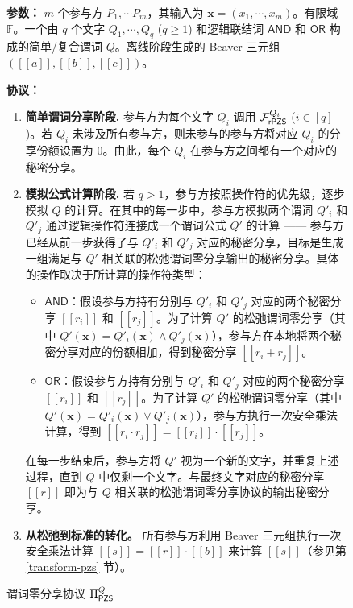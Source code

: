 \begin{figure}[!htb]
\begin{framed}
\begin{minipage}[c]{\textwidth}
\begin{trivlist}
\item \textbf{参数：} $m$ 个参与方 $P_1, \cdots P_m$，其输入为 $\textbf{x} = (x_1, \cdots, x_m)$。有限域 $\mathbb{F}$。一个由 $q$ 个文字 $Q_1,\cdots,Q_q$ ($q \ge 1$) 和逻辑联结词 $\mathsf{AND}$ 和 $\mathsf{OR}$ 构成的简单/复合谓词 $Q$。离线阶段生成的 Beaver 三元组 $([\! [ a ] \!], [\! [ b ] \!], [\! [ c ] \!])$。
\item \textbf{协议：}
\begin{enumerate}[itemsep=2pt,topsep=0pt,parsep=0pt,leftmargin=10pt]
\item \textbf{简单谓词分享阶段.} 参与方为每个文字 $Q_i$ 调用 $\mathcal{F}_\mathsf{rPZS}^{Q_i}$ ($i \in [q]$)。若 $Q_i$ 未涉及所有参与方，则未参与的参与方将对应 $Q_i$ 的分享份额设置为 $0$。由此，每个 $Q_i$ 在参与方之间都有一个对应的秘密分享。
\item \textbf{模拟公式计算阶段.} 若 $q>1$，参与方按照操作符的优先级，逐步模拟 $Q$ 的计算。在其中的每一步中，参与方模拟两个谓词 $Q'_i$ 和 $Q'_j$ 通过逻辑操作符连接成一个谓词公式 $Q'$ 的计算 —— 参与方已经从前一步获得了与 $Q'_i$ 和 $Q'_j$ 对应的秘密分享，目标是生成一组满足与 $Q'$ 相关联的松弛谓词零分享输出的秘密分享。具体的操作取决于所计算的操作符类型：
\begin{itemize}
\item $\mathsf{AND}$：假设参与方持有分别与 $Q'_i$ 和 $Q'_j$ 对应的两个秘密分享 $[\! [ r_i ] \!]$ 和 $[\! [ r_j ] \!]$。为了计算 $Q'$ 的松弛谓词零分享（其中 $Q'(\textbf{x}) = Q'_i(\textbf{x}) \land Q'_j(\textbf{x})$），参与方在本地将两个秘密分享对应的份额相加，得到秘密分享 $[\! [ r_i + r_j ] \!]$。
\item $\mathsf{OR}$：假设参与方持有分别与 $Q'_i$ 和 $Q'_j$ 对应的两个秘密分享 $[\! [ r_i ] \!]$ 和 $[\! [ r_j ] \!]$。为了计算 $Q'$ 的松弛谓词零分享（其中 $Q'(\textbf{x}) = Q'_i(\textbf{x}) \lor Q'_j(\textbf{x})$），参与方执行一次安全乘法计算，得到 $[\! [ r_i \cdot r_j ] \!] = [\! [ r_i ] \!] \cdot [\! [ r_j ] \!]$。
\end{itemize}
在每一步结束后，参与方将 $Q'$ 视为一个新的文字，并重复上述过程，直到 $Q$ 中仅剩一个文字。与最终文字对应的秘密分享 $[\! [ r ] \!]$ 即为与 $Q$ 相关联的松弛谓词零分享协议的输出秘密分享。
\item \textbf{从松弛到标准的转化。} 所有参与方利用 Beaver 三元组执行一次安全乘法计算 $[\! [ s ] \!] = [\! [ r ] \!] \cdot [\! [ b ] \!]$ 来计算 $[\! [ s ] \!]$（参见第 \ref{transform-pzs} 节）。
\end{enumerate}
\end{trivlist}
\end{minipage}
\end{framed}
\caption{谓词零分享协议 $\Pi_\mathsf{PZS}^Q$}\label{fig:proto-cpzs}
\end{figure}

